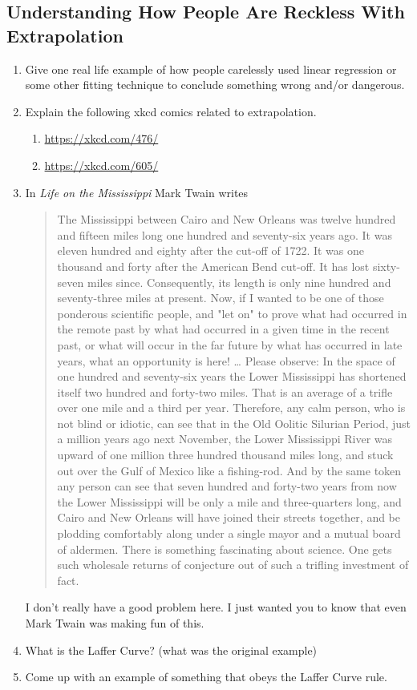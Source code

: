 \documentclass[11pt, letterpaper]{article}
\begin{document}
\subsection{Understanding How People Are Reckless With Extrapolation}
\begin{enumerate}
    \item Give one real life example of how people carelessly used linear regression or some other fitting technique to conclude something wrong and/or dangerous.
    \item Explain the following xkcd comics related to extrapolation.
    \begin{enumerate}
    	\item \url{https://xkcd.com/476/}
    	\item \url{https://xkcd.com/605/}
    \end{enumerate}
    \item In \emph{Life on the Mississippi} Mark Twain writes 
    \begin{quote}
    	The Mississippi between Cairo and New Orleans was twelve hundred and fifteen miles long one hundred and seventy-six years ago. It was eleven hundred and eighty after the cut-off of 1722. It was one thousand and forty after the American Bend cut-off. It has lost sixty-seven miles since. Consequently, its length is only nine hundred and seventy-three miles at present. Now, if I wanted to be one of those ponderous scientific people, and "let on" to prove what had occurred in the remote past by what had occurred in a given time in the recent past, or what will occur in the far future by what has occurred in late years, what an opportunity is here! … Please observe: In the space of one hundred and seventy-six years the Lower Mississippi has shortened itself two hundred and forty-two miles. That is an average of a trifle over one mile and a third per year. Therefore, any calm person, who is not blind or idiotic, can see that in the Old Oolitic Silurian Period, just a million years ago next November, the Lower Mississippi River was upward of one million three hundred thousand miles long, and stuck out over the Gulf of Mexico like a fishing-rod. And by the same token any person can see that seven hundred and forty-two years from now the Lower Mississippi will be only a mile and three-quarters long, and Cairo and New Orleans will have joined their streets together, and be plodding comfortably along under a single mayor and a mutual board of aldermen. There is something fascinating about science. One gets such wholesale returns of conjecture out of such a trifling investment of fact.
    \end{quote}
    I don't really have a good problem here. I just wanted you to know that even Mark Twain was making fun of this.
    \item What is the Laffer Curve? (what was the original example)
    \item Come up with an example of something that obeys the Laffer Curve rule.
\end{enumerate}
\end{document}
